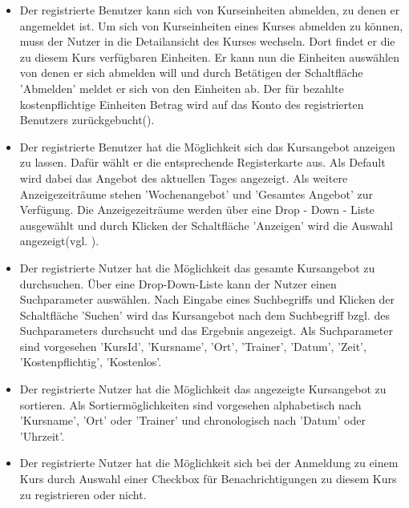 \documentclass[a4paper]{scrreprt}
\begin{document}
\begin{itemize}
	\item {}
	Der registrierte Benutzer kann sich von Kurseinheiten abmelden, zu denen er angemeldet ist. Um sich von Kurseinheiten eines Kurses abmelden zu können, muss der Nutzer in die Detailansicht des Kurses wechseln. Dort findet er die zu diesem Kurs verfügbaren Einheiten.
	Er kann nun die Einheiten auswählen von denen er sich abmelden will und durch Betätigen der Schaltfläche 'Abmelden' meldet er sich von den Einheiten ab. Der für bezahlte kostenpflichtige Einheiten Betrag wird auf das Konto des registrierten Benutzers zurückgebucht().
	\item {}
	Der registrierte Benutzer hat die Möglichkeit sich das Kursangebot anzeigen zu lassen. Dafür wählt er die entsprechende Registerkarte aus. Als Default wird dabei das Angebot des aktuellen Tages angezeigt. Als weitere Anzeigezeiträume stehen 'Wochenangebot' und 'Gesamtes Angebot' zur Verfügung. Die Anzeigezeiträume werden über eine Drop - Down - Liste ausgewählt und durch Klicken der Schaltfläche 'Anzeigen' wird die Auswahl angezeigt(vgl. ).
	\item {}
	Der registrierte Nutzer hat die Möglichkeit das gesamte Kursangebot zu durchsuchen. Über eine Drop-Down-Liste kann der Nutzer einen Suchparameter auswählen. Nach Eingabe eines Suchbegriffs und Klicken der Schaltfläche 'Suchen' wird das Kursangebot nach dem Suchbegriff bzgl. des Suchparameters durchsucht und das Ergebnis angezeigt. 
	Als Suchparameter sind vorgesehen 'KursId', 'Kursname', 'Ort', 'Trainer', 'Datum', 'Zeit', 'Kostenpflichtig', 'Kostenlos'.
	\item {}
	Der registrierte Nutzer hat die Möglichkeit das angezeigte Kursangebot zu sortieren. Als Sortiermöglichkeiten sind vorgesehen alphabetisch nach 'Kursname', 'Ort' oder 'Trainer' und chronologisch nach 'Datum' oder 'Uhrzeit'.
	\item {}
	Der registrierte Nutzer hat die Möglichkeit sich bei der Anmeldung zu einem Kurs durch Auswahl einer Checkbox  für Benachrichtigungen zu diesem Kurs zu registrieren oder nicht.
\end{itemize}
\end{document}
